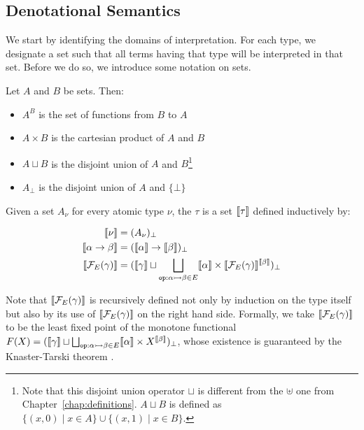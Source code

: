 \subsection{Denotational Semantics}
\label{ssec:denotational-semantics}

We start by identifying the domains of interpretation. For each type, we
designate a set such that all terms having that type will be interpreted in
that set. Before we do so, we introduce some notation on sets.

\begin{notation}
  Let $A$ and $B$ be sets. Then:

  \begin{itemize}
  \item $A^B$ is the set of functions from $B$ to $A$
  \item $A \times B$ is the cartesian product of $A$ and $B$
  \item $A \sqcup B$ is the disjoint union of $A$ and $B$\footnote{Note
      that this disjoint union operator $\sqcup$ is different from the
      $\uplus$ one from Chapter~\ref{chap:definitions}. $A \sqcup B$ is
      defined as
      $\{ (x, 0) \mid x \in A \} \cup \{ (x, 1) \mid x \in B \}$.}
  \item $A_\bot$ is the disjoint union of $A$ and $\{\bot\}$
  \end{itemize}
\end{notation}

\begin{definition}\label{def:type-domains}
  Given a set $A_\nu$ for every atomic type $\nu$, the
   $\tau$ is a set $\llbracket \tau \rrbracket$ defined
  inductively by:
  
  \begin{align*}
    \llbracket \nu \rrbracket &= (A_\nu)_\bot \\
    \llbracket \alpha \to \beta \rrbracket &= (\llbracket \alpha \rrbracket \to \llbracket \beta \rrbracket)_\bot \\
    \llbracket \mathcal{F}_E(\gamma) \rrbracket &=
      (\llbracket \gamma \rrbracket \sqcup \bigsqcup_{\mathtt{op} : \alpha \rightarrowtail \beta \in E} \llbracket \alpha \rrbracket \times \llbracket \mathcal{F}_E(\gamma) \rrbracket^{\llbracket \beta \rrbracket})_\bot
  \end{align*}
  
  Note that $\llbracket \mathcal{F}_E(\gamma) \rrbracket$ is recursively defined not only by
  induction on the type itself but also by its use of $\llbracket \mathcal{F}_E(\gamma) \rrbracket$
  on the right hand side. Formally, we take $\llbracket \mathcal{F}_E(\gamma) \rrbracket$ to be the
  least fixed point of the monotone functional
  $F(X) = (\llbracket \gamma \rrbracket \sqcup \bigsqcup_{\mathtt{op} : \alpha \rightarrowtail \beta \in
    E} \llbracket \alpha \rrbracket \times X^{\llbracket \beta \rrbracket})_\bot$, whose existence is
  guaranteed by the Knaster-Tarski theorem
  \cite{knaster1928theoreme,tarski1955lattice}.
\end{definition}

